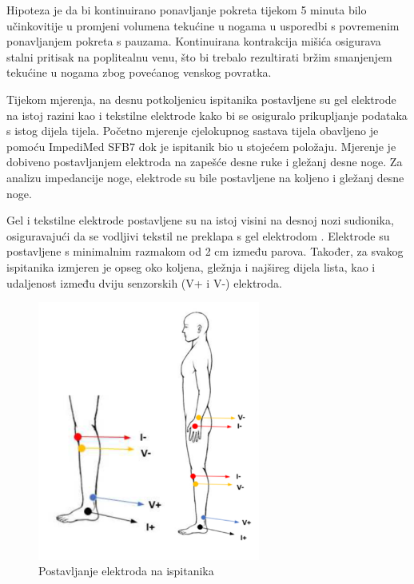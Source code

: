 \documentclass[../diplomski_rad.tex]{subfiles}
\begin{document}
Hipoteza je da bi kontinuirano ponavljanje pokreta tijekom 5 minuta bilo učinkovitije u promjeni volumena 
tekućine u nogama u usporedbi s povremenim ponavljanjem pokreta s pauzama. 
Kontinuirana kontrakcija mišića osigurava stalni pritisak na poplitealnu venu, 
što bi trebalo rezultirati bržim smanjenjem tekućine u nogama zbog povećanog venskog povratka.

Tijekom mjerenja, na desnu potkoljenicu ispitanika postavljene su gel elektrode na istoj razini kao i 
tekstilne elektrode kako bi se osiguralo prikupljanje podataka s istog dijela tijela. 
Početno mjerenje cjelokupnog sastava tijela obavljeno je pomoću ImpediMed SFB7 dok je ispitanik bio u stojećem položaju. 
Mjerenje je dobiveno postavljanjem elektroda na zapešće desne ruke i gležanj desne noge. 
Za analizu impedancije noge, elektrode su bile postavljene na koljeno i gležanj desne noge.

Gel i tekstilne elektrode postavljene su na istoj visini na desnoj nozi sudionika, osiguravajući da se 
vodljivi tekstil ne preklapa s gel elektrodom \cite{Piper2023}. 
Elektrode su postavljene s minimalnim razmakom od 2 cm između parova. 
Također, za svakog ispitanika izmjeren je opseg oko koljena, gležnja i najšireg dijela lista, 
kao i udaljenost između dviju senzorskih (V+ i V-) elektroda.

\begin{figure}[htb]
    \centering
    \includegraphics[width=0.65\textwidth]{Figures/postavljanje_elektroda.png} 
    \caption{Postavljanje elektroda na ispitanika \cite{Piper2023}}
    \label{slk:postavljanje_elektroda}
\end{figure}
\end{document}
